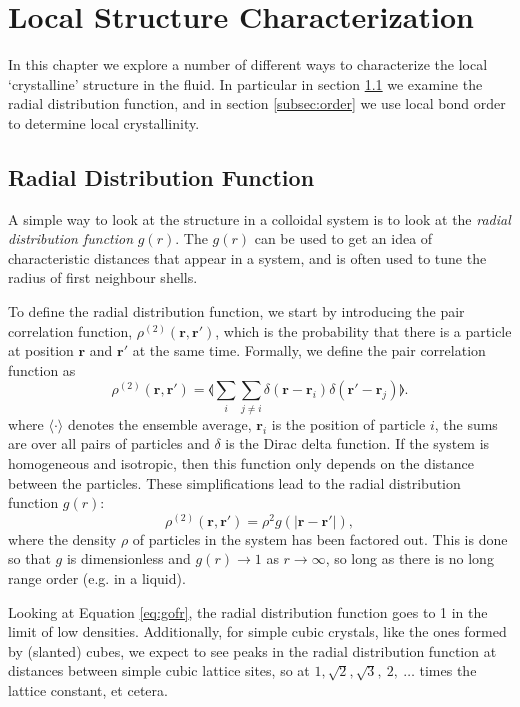 \documentclass[thesis]{subfiles}
\begin{document}
\newpage


\section{Local Structure Characterization}

In this chapter we explore a number of different ways to characterize the local `crystalline' structure in the fluid. In particular in section \ref{subsec:rdf} we examine the radial distribution function, and in section \ref{subsec:order} we use local bond order to determine local crystallinity.

\subsection{Radial Distribution Function} \label{subsec:rdf}

A simple way to look at the structure in a colloidal system is to look at the \emph{radial distribution function} $g(r)$.  The $g(r)$ can be used to get an idea of characteristic distances that appear in a system, and is often used to tune the radius of first neighbour shells.  

To define the radial distribution function, we start by introducing the pair correlation function, 
 $\rho^{(2)}(\bm r, \bm r')$,  which is the probability that there is a particle at position $\bm r$ and $\bm r'$ at the same time. Formally, we define the pair correlation function as 
\begin{equation}
\rho^{(2)}(\bm r, \bm r') = \llangle \sum_i \sum_{j \neq i} \delta(\bm r - \bm r_i) \delta(\bm r' - \bm r_j) \rrangle.
\end{equation}
where $\langle \cdot \rangle$ denotes the ensemble average, $\bm r_i$ is the position of particle $i$, the sums are over all pairs of particles and $\delta$ is the Dirac delta function.
If the system is homogeneous and isotropic, then this function only depends on the distance between the particles. These simplifications lead to the radial distribution function $g(r)$:
\begin{equation}
\rho^{(2)}(\bm r, \bm r') = \rho^2 g(|\bm r - \bm r'|), \label{eq:gofr}
\end{equation}
where the density $\rho$ of particles in the system has been factored out. This is done so that $g$ is dimensionless and $g(r) \rightarrow 1$ as $r \rightarrow \infty$, so long as there is no long range order (e.g. in a liquid).

Looking at Equation \ref{eq:gofr}, the radial distribution function goes to 1 in the limit of low densities. Additionally, for simple cubic crystals, like the ones formed by (slanted) cubes, we expect to see peaks in the radial distribution function at distances between simple cubic lattice sites, so at $1, \sqrt 2, \sqrt 3,\ 2,\ \ldots$ times the lattice constant, et cetera.
\end{document}
